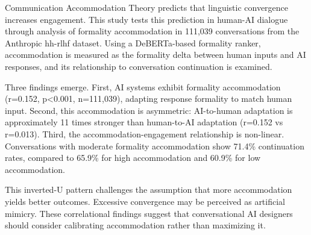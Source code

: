 
Communication Accommodation Theory predicts that linguistic convergence increases engagement. This study tests this prediction in human-AI dialogue through analysis of formality accommodation in 111,039 conversations from the Anthropic hh-rlhf dataset. Using a DeBERTa-based formality ranker, accommodation is measured as the formality delta between human inputs and AI responses, and its relationship to conversation continuation is examined.

Three findings emerge. First, AI systems exhibit formality accommodation (r=0.152, p<0.001, n=111,039), adapting response formality to match human input. Second, this accommodation is asymmetric: AI-to-human adaptation is approximately 11 times stronger than human-to-AI adaptation (r=0.152 vs r=0.013). Third, the accommodation-engagement relationship is non-linear. Conversations with moderate formality accommodation show 71.4\% continuation rates, compared to 65.9\% for high accommodation and 60.9\% for low accommodation.

This inverted-U pattern challenges the assumption that more accommodation yields better outcomes. Excessive convergence may be perceived as artificial mimicry. These correlational findings suggest that conversational AI designers should consider calibrating accommodation rather than maximizing it.

